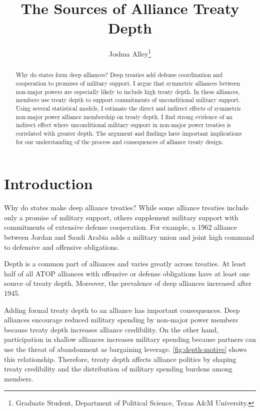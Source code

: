 \documentclass[12pt]{article}
\title{\textbf{The Sources of Alliance Treaty Depth}}
\author{Joshua Alley\footnote{Graduate Student,
Department of Political Science, Texas A\&M University.}}
\date{}
\begin{document}
\maketitle 

\doublespace 

\begin{abstract}
Why do states form deep alliances? 
Deep treaties add defense coordination and cooperation to promises of military support.
I argue that symmetric alliances between non-major powers are especially likely to include high treaty depth. 
In these alliances, members use treaty depth to support commitments of unconditional military support.
Using several statistical models, I estimate the direct and indirect effects of symmetric non-major power alliance membership on treaty depth. 
I find strong evidence of an indirect effect where unconditional military support in non-major power treaties is correlated with greater depth. 
The argument and findings have important implications for our understanding of the process and consequences of alliance treaty design. 
\end{abstract}


\newpage 


\section{Introduction}


Why do states make deep alliance treaties? 
While some alliance treaties include only a promise of military support, others supplement military support with commitments of extensive defense cooperation. 
For example, a 1962 alliance between Jordan and Saudi Arabia adds a military union and joint high command to defensive and offensive obligations. 


Depth is a common part of alliances and varies greatly across treaties. 
At least half of all ATOP alliances with offensive or defense obligations have at least one source of treaty depth.
Moreover, the prevalence of deep alliances increased after 1945. 


Adding formal treaty depth to an alliance has important consequences. 
Deep alliances encourage reduced military spending by non-major power members because treaty depth increases alliance credibility.  
On the other hand, participation in shallow alliances increases military spending because partners can use the threat of abandonment as bargaining leverage. 
\autoref{fig:depth-motive} shows this relationship. 
Therefore, treaty depth affects alliance politics by shaping treaty credibility and the distribution of military spending burdens among members. 
\end{document}
